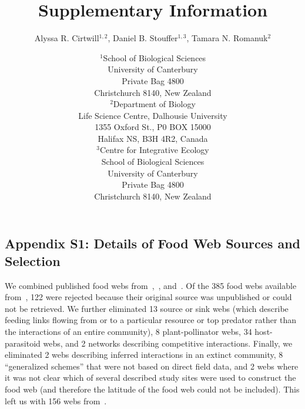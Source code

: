 \documentclass[12pt]{article}
\newcommand{\beginsupplement}{%
        \setcounter{table}{0}
        \renewcommand{\thetable}{S\arabic{table}}%
        \setcounter{figure}{0}
        \renewcommand{\thefigure}{S\arabic{figure}}%
     }
\begin{document}
\title{Supplementary Information}
\author{Alyssa R. Cirtwill$^{1,2}$, Daniel B. Stouffer$^{1,3}$, Tamara N. Romanuk$^{2}$}
\date{\small$^1$School of Biological Sciences\\University of Canterbury\\
Private Bag 4800\\Christchurch 8140, New Zealand \\
\medskip$^2$Department of Biology\\
Life Science Centre, Dalhousie University\\1355 Oxford St., P0 BOX 15000\\
Halifax NS, B3H 4R2, Canada\\
\medskip$^3$Centre for Integrative Ecology\\School of Biological Sciences\\University of Canterbury\\
Private Bag 4800\\Christchurch 8140, New Zealand \\}



\maketitle
\baselineskip=8.5mm

\vspace{0.4 in}
\beginsupplement
\subsection*{Appendix S1: Details of Food Web Sources and Selection}

  We combined published food webs from~\citet{GlobaWeb},~\citet{Brose2006}, 
  and~\citet{Dunne2013}.
  Of the 385 food webs available from~\citet{Globalweb}, 122 were rejected because their original
  source was unpublished or could not be retrieved. We further eliminated 13 source or sink webs
  (which describe feeding links flowing from or to a particular resource or top predator rather
  than the interactions of an entire community), 8 plant-pollinator webs, 34 host-parasitoid webs,
  and 2 networks describing competitive interactions. Finally, we eliminated 2 webs describing 
  inferred interactions in an extinct community, 8 ``generalized schemes'' that were not based
  on direct field data, and 2 webs where it was not clear which of several described study sites
  were used to construct the food web (and therefore the latitude of the food web could not be 
  included). This left us with 156 webs from~\citet{GlobalWeb}.
\end{document}
